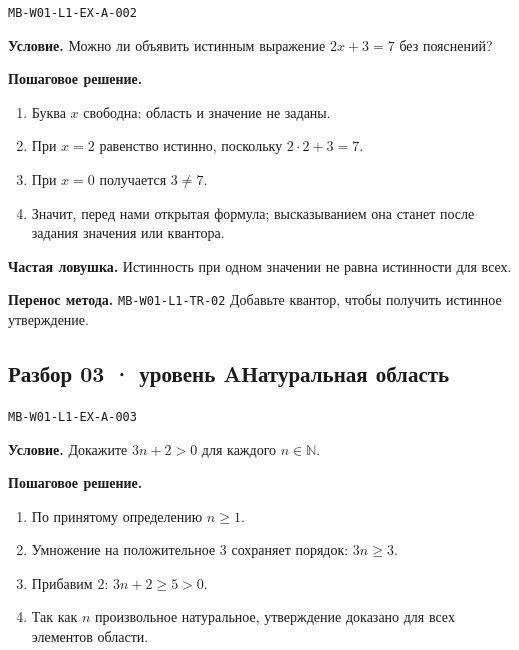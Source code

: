 \documentclass[11pt,a4paper,openany]{book}
\newcommand{\mtag}[1]{\textsf{\small\color{mbaccent}\bfseries #1}}
\newcommand{\muid}[1]{\texttt{\footnotesize #1}}
\begin{document}
\muid{MB-W01-L1-EX-A-002}\par

\begin{keybox}\textbf{Условие.} Можно ли объявить истинным выражение $2x+3=7$ без пояснений?\end{keybox}

\textbf{Пошаговое решение.}\par
\begin{enumerate}[label=\arabic*),leftmargin=*,itemsep=3pt,topsep=4pt]
\item Буква $x$ свободна: область и значение не заданы.
\item При $x=2$ равенство истинно, поскольку $2\cdot2+3=7$.
\item При $x=0$ получается $3\ne7$.
\item Значит, перед нами открытая формула; высказыванием она станет после задания значения или квантора.
\end{enumerate}


\begin{learnbox}\textbf{Частая ловушка.} Истинность при одном значении не равна истинности для всех.\par \textbf{Перенос метода.} \muid{MB-W01-L1-TR-02} Добавьте квантор, чтобы получить истинное утверждение.\end{learnbox}

\subsection*{\mtag{Разбор 03 · уровень A}\quad Натуральная область}\hypertarget{MB-W01-L1-EX-A-003}{}

\muid{MB-W01-L1-EX-A-003}\par

\begin{keybox}\textbf{Условие.} Докажите $3n+2>0$ для каждого $n\in\mathbb N$.\end{keybox}

\textbf{Пошаговое решение.}\par
\begin{enumerate}[label=\arabic*),leftmargin=*,itemsep=3pt,topsep=4pt]
\item По принятому определению $n\ge1$.
\item Умножение на положительное $3$ сохраняет порядок: $3n\ge3$.
\item Прибавим $2$: $3n+2\ge5>0$.
\item Так как $n$ произвольное натуральное, утверждение доказано для всех элементов области.
\end{enumerate}
\end{document}
